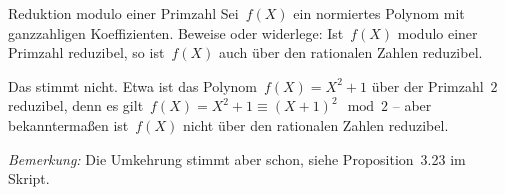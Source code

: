 \documentclass{algblatt}
\begin{document}
\begin{aufgabe}{Reduktion modulo einer Primzahl}
Sei~$f(X)$ ein normiertes Polynom mit ganzzahligen Koeffizienten. Beweise oder
widerlege: Ist~$f(X)$ modulo einer Primzahl reduzibel, so ist~$f(X)$ auch über
den rationalen Zahlen reduzibel.

\begin{loesung}
Das stimmt nicht. Etwa ist das Polynom~$f(X) = X^2 + 1$ über der Primzahl~$2$
reduzibel, denn es gilt~$f(X) = X^2 + 1 \equiv (X + 1)^2 \mod 2$ -- aber
bekanntermaßen ist~$f(X)$ nicht über den rationalen Zahlen reduzibel.

\emph{Bemerkung:} Die Umkehrung stimmt aber schon, siehe Proposition~3.23 im
Skript.
\end{loesung}
\end{aufgabe}
\end{document}
